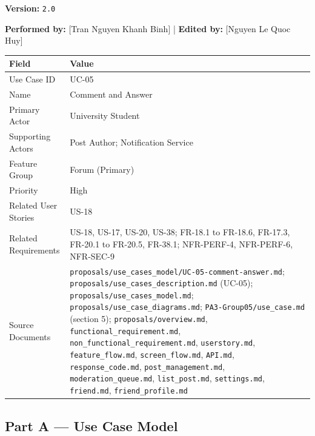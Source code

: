 \documentclass[12pt]{article}
\renewcommand{\baselinestretch}{1.5}
\begin{document}
\textbf{Version:} \texttt{2.0}
\par\medskip

\textbf{Performed by:} [Tran Nguyen Khanh Binh] | \textbf{Edited by:} [Nguyen Le Quoc Huy]
\par\medskip

\begingroup
\small
\renewcommand{\baselinestretch}{1.0}\selectfont
\renewcommand{\arraystretch}{1.15}
\setlength{\tabcolsep}{6pt}
\begin{longtable}{|>{\raggedright\arraybackslash}p{}|>{\raggedright\arraybackslash}p{}|}
\hline
\textbf{Field} & \textbf{Value} \\ \hline
\endhead
Use Case ID & UC-05 \\ \hline
Name & Comment and Answer \\ \hline
Primary Actor & University Student \\ \hline
Supporting Actors & Post Author; Notification Service \\ \hline
Feature Group & Forum (Primary) \\ \hline
Priority & High \\ \hline
Related User Stories & US-18 \\ \hline
Related Requirements & US-18, US-17, US-20, US-38; FR-18.1 to FR-18.6, FR-17.3, FR-20.1 to FR-20.5, FR-38.1; NFR-PERF-4, NFR-PERF-6, NFR-SEC-9 \\ \hline
Source Documents & \texttt{proposals/use\_cases\_model/UC-05-comment-answer.md}; \texttt{proposals/use\_cases\_description.md} (UC-05); \texttt{proposals/use\_cases\_model.md}; \texttt{proposals/use\_case\_diagrams.md}; \texttt{PA3-Group05/use\_case.md} (section 5); \texttt{proposals/overview.md}, \texttt{functional\_requirement.md}, \texttt{non\_functional\_requirement.md}, \texttt{userstory.md}, \texttt{feature\_flow.md}, \texttt{screen\_flow.md}, \texttt{API.md}, \texttt{response\_code.md}, \texttt{post\_management.md}, \texttt{moderation\_queue.md}, \texttt{list\_post.md}, \texttt{settings.md}, \texttt{friend.md}, \texttt{friend\_profile.md} \\ \hline
\end{longtable}
\endgroup
\par\medskip

\hypertarget{sec:part-a-use-case-model}{}
\subsection*{Part A --- Use Case Model}
\par\medskip
\end{document}
